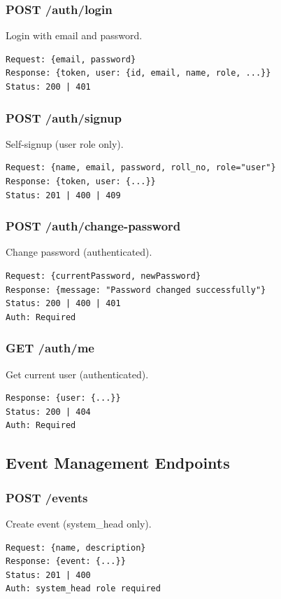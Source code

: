 \documentclass[12pt,a4paper]{article}
\begin{document}
\subsubsection{POST /auth/login}
Login with email and password.
\begin{lstlisting}
Request: {email, password}
Response: {token, user: {id, email, name, role, ...}}
Status: 200 | 401
\end{lstlisting}

\subsubsection{POST /auth/signup}
Self-signup (user role only).
\begin{lstlisting}
Request: {name, email, password, roll_no, role="user"}
Response: {token, user: {...}}
Status: 201 | 400 | 409
\end{lstlisting}

\subsubsection{POST /auth/change-password}
Change password (authenticated).
\begin{lstlisting}
Request: {currentPassword, newPassword}
Response: {message: "Password changed successfully"}
Status: 200 | 400 | 401
Auth: Required
\end{lstlisting}

\subsubsection{GET /auth/me}
Get current user (authenticated).
\begin{lstlisting}
Response: {user: {...}}
Status: 200 | 404
Auth: Required
\end{lstlisting}

\subsection{Event Management Endpoints}

\subsubsection{POST /events}
Create event (system\_head only).
\begin{lstlisting}
Request: {name, description}
Response: {event: {...}}
Status: 201 | 400
Auth: system_head role required
\end{lstlisting}
\end{document}
